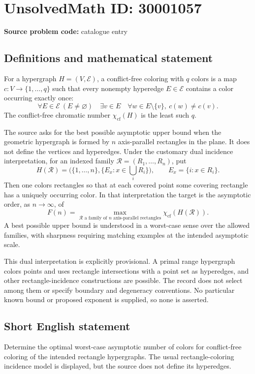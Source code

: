 \documentclass[11pt]{article}
\begin{document}
\section*{UnsolvedMath ID: 30001057}
\textbf{Source problem code:} catalogue entry
\subsection{Definitions and mathematical statement}
For a hypergraph \(H=(V,\mathcal E)\), a conflict-free coloring with \(q\) colors is a map \(c:V\to\{1,\ldots,q\}\) such that every nonempty hyperedge \(E\in\mathcal E\) contains a color occurring exactly once:
\[
\forall E\in\mathcal E\ (E\ne\varnothing)\quad
\exists v\in E\quad
\forall w\in E\setminus\{v\},\ c(w)\ne c(v).
\]
The conflict-free chromatic number \(\chi_{\mathrm{cf}}(H)\) is the least such \(q\).

The source asks for the best possible asymptotic upper bound when the geometric hypergraph is formed by \(n\) axis-parallel rectangles in the plane. It does not define the vertices and hyperedges. Under the customary dual incidence interpretation, for an indexed family \(\mathcal R=(R_1,\ldots,R_n)\), put
\[
H(\mathcal R)=\bigl(\{1,\ldots,n\},\{E_x:x\in\bigcup_iR_i\}\bigr),
\qquad E_x=\{i:x\in R_i\}.
\]
Then one colors rectangles so that at each covered point some covering rectangle has a uniquely occurring color. In that interpretation the target is the asymptotic order, as \(n\to\infty\), of
\[
F(n)=\max_{\mathcal R\text{ a family of }n\text{ axis-parallel rectangles}}
\chi_{\mathrm{cf}}(H(\mathcal R)).
\]
A best possible upper bound is understood in a worst-case sense over the allowed families, with sharpness requiring matching examples at the intended asymptotic scale.

This dual interpretation is explicitly provisional. A primal range hypergraph colors points and uses rectangle intersections with a point set as hyperedges, and other rectangle-incidence constructions are possible. The record does not select among them or specify boundary and degeneracy conventions. No particular known bound or proposed exponent is supplied, so none is asserted.
\subsection{Short English statement}
Determine the optimal worst-case asymptotic number of colors for conflict-free coloring of the intended rectangle hypergraphs. The usual rectangle-coloring incidence model is displayed, but the source does not define its hyperedges.
\end{document}
